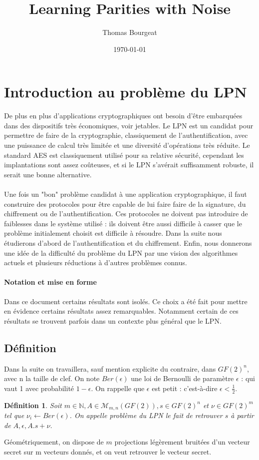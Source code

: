 \documentclass{article}		%
\newtheorem{defi}{Définition}
\theoremstyle{definition}
\theoremstyle{plain}
\theoremstyle{plain}
\theoremstyle{plain}
\theoremstyle{plain}
\begin{document}
\title{Learning Parities with Noise}
\author{Thomas Bourgeat}
\date\today
\maketitle
\section{Introduction au problème du LPN}
De plus en plus d'applications cryptographiques ont besoin d'être embarquées dans des dispositifs très économiques, voir jetables. Le LPN est un candidat
pour permettre de faire de la cryptographie, classiquement de
l'authentification, avec une puissance de calcul
très limitée et une diversité d'opérations très réduite.
Le standard AES est classiquement utilisé pour sa relative sécurité,
cependant les implantations sont assez coûteuses, et si le LPN s'avérait suffisamment
robuste, il serait une bonne alternative.
\\\\
Une fois un "bon" problème candidat à une application cryptographique, il
faut construire des protocoles pour être capable de lui faire faire de la
signature, du chiffrement ou de l'authentification. Ces protocoles ne
doivent pas introduire de faiblesses dans le système utilisé : ils doivent
être aussi difficile à casser que le problème initialement choisit est
difficile à résoudre.
Dans la suite nous étudierons d'abord de l'authentification et du
chiffrement. Enfin, nous donnerons une idée de la difficulté du
problème du LPN par une vision des algorithmes actuels et plusieurs
réductions à d'autres problèmes connus.
\paragraph{Notation et mise en forme}
Dans ce document certains résultats sont isolés. Ce choix a été fait pour
mettre en évidence certains résultats assez remarquables. Notamment
certain de ces résultats
se trouvent parfois dans un contexte plus général que le LPN. 
\subsection{Définition}
Dans la suite on travaillera, sauf mention explicite du contraire, dans
$GF(2)^n$, avec n la taille de clef. On note $Ber(\epsilon)$
une loi de Bernoulli de paramètre $\epsilon$ : qui vaut 1 avec
probabilité $1-\epsilon$. On rappelle que $\epsilon$ est petit : c'est-à-dire $\epsilon < \frac {1}{2}$.  
\begin{defi}
Soit $m \in \mathbb{N}, A \in \mathcal{M}_{m, n}(GF(2)), s \in GF(2)^n$ et
$\nu \in GF(2)^m$ tel que $\nu_i \leftarrow Ber(\epsilon)$. On appelle
problème du LPN le fait de retrouver $s$ à partir de $A, \epsilon,
A.s+\nu$. 
\end{defi}
Géométriquement, on dispose de $m$ projections légèrement bruitées d'un vecteur secret sur m
vecteurs donnés, et on veut retrouver le vecteur secret.
\end{document}
